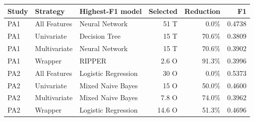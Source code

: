 \begin{tabular*}{\textwidth}{@{\extracolsep{\fill}}lllrrr@{}}
\toprule
Study & Strategy & Highest-F1 model & Selected & Reduction & F1 \\
\midrule
PA1 & All Features & Neural Network & 51 T & 0.0\% & 0.4738 \\
PA1 & Univariate & Decision Tree & 15 T & 70.6\% & 0.3809 \\
PA1 & Multivariate & Neural Network & 15 T & 70.6\% & 0.3902 \\
PA1 & Wrapper & RIPPER & 2.6 O & 91.3\% & 0.3996 \\
\addlinespace[2pt]
PA2 & All Features & Logistic Regression & 30 O & 0.0\% & 0.5373 \\
PA2 & Univariate & Mixed Naive Bayes & 15 O & 50.0\% & 0.4600 \\
PA2 & Multivariate & Mixed Naive Bayes & 7.8 O & 74.0\% & 0.3962 \\
PA2 & Wrapper & Logistic Regression & 14.6 O & 51.3\% & 0.4696 \\
\bottomrule
\end{tabular*}
